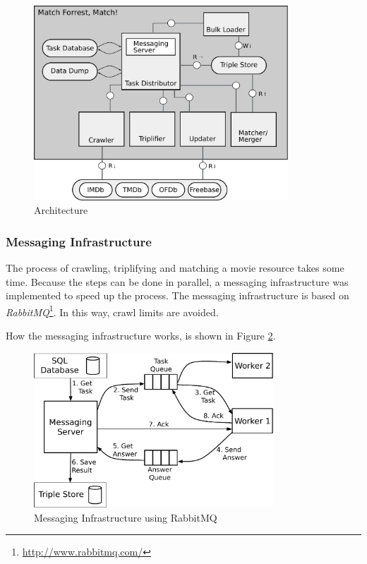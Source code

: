\begin{figure}[ht]
  \begin{center}
  \includegraphics[width=0.85\textwidth]{images/architecture.pdf}
  \end{center}
  \caption{Architecture}
  \label{fig_architecture}
\end{figure}

\subsubsection{Messaging Infrastructure}
\label{subsubsec_messaging_infrastructure}

The process of crawling, triplifying and matching a movie resource takes some time.
Because the steps can be done in parallel, a messaging infrastructure was implemented to speed up the process.
The messaging infrastructure is based on \emph{RabbitMQ}\footnote{\url{http://www.rabbitmq.com/}}.
In this way, crawl limits are avoided.

How the messaging infrastructure works, is shown in Figure \ref{fig_messaging_infrastructure}.

\begin{figure}[ht]
  \begin{center}
  \includegraphics[width=0.8\textwidth]{images/rabbit_mq.pdf}
  \end{center}
  \caption{Messaging Infrastructure using RabbitMQ}
  \label{fig_messaging_infrastructure}
\end{figure}

